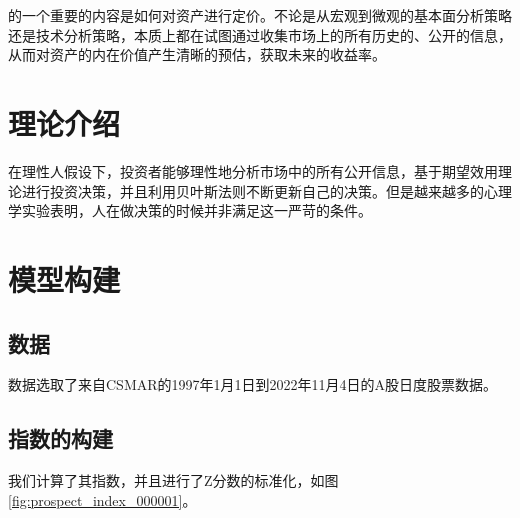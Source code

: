 \documentclass[a4paper,12pt]{report}
\begin{document}
\newpage

\setcounter{page}{1}
\tableofcontents %
\newpage

\chapter*{ \heiti \MYTITLE}
\setcounter{page}{1}
的一个重要的内容是如何对资产进行定价。不论是从宏观到微观的基本面分析策略还是技术分析策略，本质上都在试图通过收集市场上的所有历史的、公开的信息，从而对资产的内在价值产生清晰的预估，获取未来的收益率。

\chapter{理论介绍}
在理性人假设下，投资者能够理性地分析市场中的所有公开信息，基于期望效用理论进行投资决策，并且利用贝叶斯法则不断更新自己的决策。但是越来越多的心理学实验表明，人在做决策的时候并非满足这一严苛的条件。

\chapter{模型构建}

\section{数据}
数据选取了来自CSMAR的1997年1月1日到2022年11月4日的A股日度股票数据。

\section{指数的构建}
我们计算了其指数，并且进行了Z分数的标准化，如图\ref{fig:prospect_index_000001}。
\end{document}
